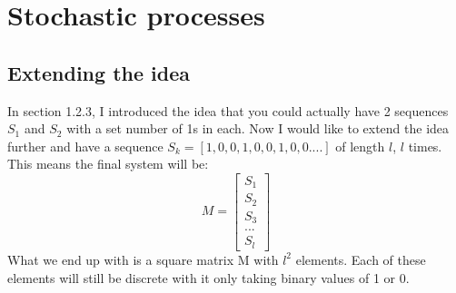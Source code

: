 \chapter{Stochastic processes}
\section{Extending the idea}
 In section 1.2.3, I introduced the idea that you could actually have 2 sequences $S_{1}$ and $S_{2}$ with a set number of 1s in each. Now I would like to extend the idea further and have a sequence $S_{k}=[1,0,0,1,0,0,1,0,0....]$ of length $l$, $l$ times. This means the final system will be:
$$M=\begin{bmatrix}
S_{1} \\
S_{2}\\
S_{3}\\
... \\
S_{l}
\end{bmatrix}$$
What we end up with is a square matrix M with $l^{2}$ elements. Each of these elements will still be discrete with it only taking binary values of 1 or 0.\par

